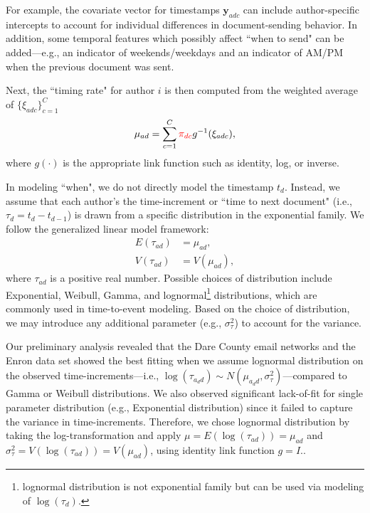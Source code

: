 \documentclass{article}
\begin{document}
For example, the covariate vector for timestamps $\boldsymbol{y}_{adc}$ can include author-specific intercepts to account for individual differences in document-sending behavior. In addition, some temporal features which possibly affect ``when to send" can be added---e.g., an indicator of weekends/weekdays and an indicator of AM/PM when the previous document was sent. 

Next, the ``timing rate" for author $i$ is then computed from the weighted average of $\{\xi_{adc}\}_{c=1}^C$ 
\begin{equation}
\mu_{ad} = \sum_{c=1}^C \textcolor{red}{\pi_{dc}}g^{-1}(\xi_{adc}),
\end{equation}
where $g(\cdot)$ is the appropriate link function such as identity, log, or inverse. 

In modeling ``when", we do not directly model the timestamp $t_d$. Instead, we assume that each author's the time-increment or ``time to next document" (i.e., $\tau_{d} = t_d-t_{d-1}$) is drawn from a specific distribution in the exponential family.  We follow the generalized linear model framework:
\begin{equation}
\begin{aligned}
E(\tau_{ad}) &= \mu_{ad},\\
V(\tau_{ad}) &= V(\mu_{ad}),
\end{aligned}
\end{equation}
where $\tau_{ad}$ is a positive real number. Possible choices of distribution include Exponential, Weibull, Gamma, and lognormal\footnote{lognormal distribution is not exponential family but can be used via modeling of $\log(\tau_d)$.} distributions, which are commonly used in time-to-event modeling. Based on the choice of distribution, we may introduce any additional parameter (e.g., $\sigma_\tau^2$) to account for the variance.

Our preliminary analysis revealed that the Dare County email networks and the Enron data set showed the best fitting when we assume lognormal distribution on the observed time-increments---i.e., $\log(\tau_{a_dd}) \sim N(\mu_{a_d d}, \sigma^2_\tau)$---compared to Gamma or Weibull distributions. We also observed significant lack-of-fit for single parameter distribution (e.g., Exponential distribution) since it failed to capture the variance in time-increments. Therefore, we chose lognormal distribution by taking the log-transformation and apply $\mu = E(\log(\tau_{ad})) = \mu_{ad}$ and $ \sigma_\tau^2=V(\log(\tau_{ad})) = V(\mu_{ad})$, using identity link function $g = I$.. 
\end{document}
